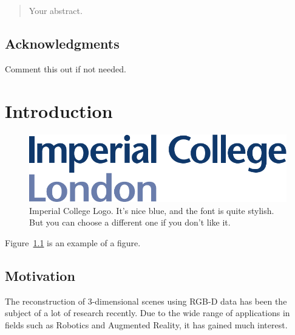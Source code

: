 \documentclass[12pt,twoside]{report}
\begin{document}



\clearpage{\pagestyle{empty}\cleardoublepage}
\setcounter{page}{1}
\pagestyle{fancy}

\begin{abstract}
Your abstract.
\end{abstract}

\cleardoublepage
\section*{Acknowledgments}
Comment this out if not needed.

\clearpage{\pagestyle{empty}\cleardoublepage}

\tableofcontents 


\clearpage{\pagestyle{empty}\cleardoublepage}
\setcounter{page}{1}
\fancyhead[LE,RO]{\slshape \rightmark}
\fancyhead[LO,RE]{\slshape \leftmark}

\chapter{Introduction}

\begin{figure}[tb]
\centering
\includegraphics[width = 0.4\hsize]{./figures/imperial}
\caption{Imperial College Logo. It's nice blue, and the font is quite stylish. But you can choose a different one if you don't like it.}
\label{fig:logo}
\end{figure}

Figure~\ref{fig:logo} is an example of a figure. 

\section{Motivation}

The reconstruction of 3-dimensional scenes using RGB-D data has been the subject of a lot of research recently. Due to the wide range of applications in fields such as Robotics and Augmented Reality, it has gained much interest.
\end{document}
